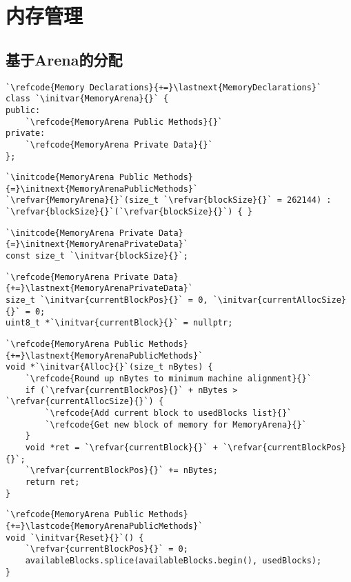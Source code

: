 \section{内存管理}\label{sec:内存管理}

\subsection{基于Arena的分配}\label{sub:基于Arena的分配}
\begin{lstlisting}
`\refcode{Memory Declarations}{+=}\lastnext{MemoryDeclarations}`
class `\initvar{MemoryArena}{}` {
public:
    `\refcode{MemoryArena Public Methods}{}`
private:
    `\refcode{MemoryArena Private Data}{}`
};
\end{lstlisting}

\begin{lstlisting}
`\initcode{MemoryArena Public Methods}{=}\initnext{MemoryArenaPublicMethods}`
`\refvar{MemoryArena}{}`(size_t `\refvar{blockSize}{}` = 262144) : `\refvar{blockSize}{}`(`\refvar{blockSize}{}`) { }
\end{lstlisting}

\begin{lstlisting}
`\initcode{MemoryArena Private Data}{=}\initnext{MemoryArenaPrivateData}`
const size_t `\initvar{blockSize}{}`;
\end{lstlisting}

\begin{lstlisting}
`\refcode{MemoryArena Private Data}{+=}\lastnext{MemoryArenaPrivateData}`
size_t `\initvar{currentBlockPos}{}` = 0, `\initvar{currentAllocSize}{}` = 0;
uint8_t *`\initvar{currentBlock}{}` = nullptr;
\end{lstlisting}

\begin{lstlisting}
`\refcode{MemoryArena Public Methods}{+=}\lastnext{MemoryArenaPublicMethods}`
void *`\initvar{Alloc}{}`(size_t nBytes) {
    `\refcode{Round up nBytes to minimum machine alignment}{}`
    if (`\refvar{currentBlockPos}{}` + nBytes > `\refvar{currentAllocSize}{}`) {
        `\refcode{Add current block to usedBlocks list}{}`
        `\refcode{Get new block of memory for MemoryArena}{}`
    }
    void *ret = `\refvar{currentBlock}{}` + `\refvar{currentBlockPos}{}`;
    `\refvar{currentBlockPos}{}` += nBytes;
    return ret;
}
\end{lstlisting}

\begin{lstlisting}
`\refcode{MemoryArena Public Methods}{+=}\lastcode{MemoryArenaPublicMethods}`
void `\initvar{Reset}{}`() {
    `\refvar{currentBlockPos}{}` = 0;
    availableBlocks.splice(availableBlocks.begin(), usedBlocks);
}
\end{lstlisting}